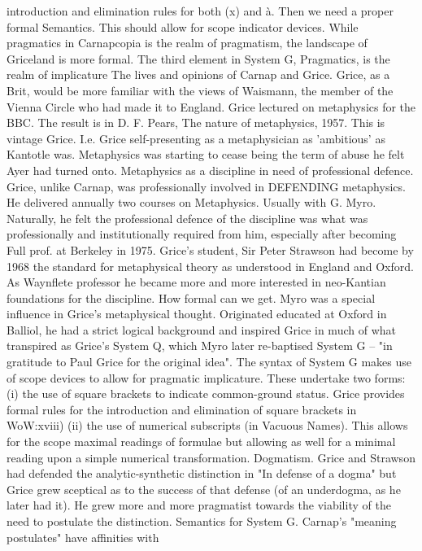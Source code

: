 \documentclass[10pt,titlepage]{book}
\begin{document}
introduction and elimination rules for both (x) and à.  Then we need a proper 
formal Semantics. This should allow for scope indicator  devices. While 
pragmatics in Carnapcopia is the realm of pragmatism, the  landscape of Griceland 
is more formal. The third element in System G,  Pragmatics, is the realm of 
implicature 
The  lives and opinions of Carnap and Grice. Grice, as a Brit, would be 
more familiar  with the views of Waismann, the member of the Vienna Circle who 
had made it to  England. Grice lectured on metaphysics for the BBC. The 
result is in D. F.  Pears, The nature of metaphysics, 1957. This is vintage 
Grice. I.e. Grice  self-presenting as a metaphysician as 'ambitious' as Kantotle 
was. Metaphysics  was starting to cease being the term of abuse he felt 
Ayer had turned  onto. 
Metaphysics  as a discipline in need of professional defence. Grice, unlike 
Carnap, was  professionally involved in DEFENDING metaphysics. He delivered 
annually two  courses on Metaphysics. Usually with G. Myro. Naturally, he 
felt the  professional defence of the discipline was what was professionally 
and  institutionally required from him, especially after becoming Full prof. 
at  Berkeley in 1975. Grice's student, Sir Peter Strawson had become by 
1968 the  standard for metaphysical theory as understood in England and 
Oxford. As  Waynflete professor he became more and more interested in neo-Kantian 
 foundations for the discipline. 
How  formal can we get. Myro was a special influence in Grice's 
metaphysical thought.  Originated educated at Oxford in Balliol, he had a strict 
logical background and  inspired Grice in much of what transpired as Grice's 
System Q, which Myro later  re-baptised System G -- "in gratitude to Paul Grice 
for the original idea". The  syntax of System G makes use of scope devices to 
allow for pragmatic  implicature. These undertake two forms: (i) the use of 
square brackets to  indicate common-ground status. Grice provides formal 
rules for the introduction  and elimination of square brackets in WoW:xviii) 
(ii)  the use of numerical subscripts (in Vacuous Names). This allows for 
the scope  maximal readings of formulae but allowing as well for a minimal 
reading upon a  simple numerical transformation.  
Dogmatism.  Grice and Strawson had defended the analytic-synthetic 
distinction in "In  defense of a dogma" but Grice grew sceptical as to the success 
of that defense  (of an underdogma, as he later had it). He grew more and 
more pragmatist towards  the viability of the need to postulate the 
distinction. 
Semantics  for System G. Carnap's "meaning postulates" have affinities with 
\end{document}
